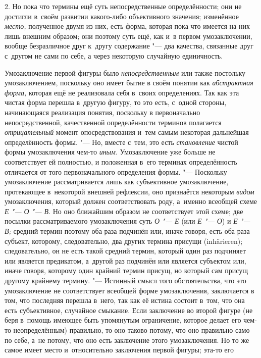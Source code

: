 2. Но пока что термины ещё суть непосредственные
определённости; они не достигли в~своём развитии какого-либо объективного
значения; изменённое {\em место,}
полученное двумя из них, есть форма, которая пока что имеется
на них лишь внешним образом; они поэтому суть ещё, как и~в
первом умозаключении, вообще безразличное друг к~другу содержание
"--- два качества, связанные друг с~другом не сами по себе, а
через некоторую случайную единичность.

Умозаключение первой фигуры было {\em непосредственным}
или также постольку умозаключением, поскольку оно имеет бытие
в своём понятии как {\em абстрактная
форма,} которая ещё не реализовала себя в~своих
определениях. Так как эта чистая форма перешла в~другую фигуру, то это
есть, с~одной стороны, начинающаяся реализация понятия, поскольку в
первоначально непосредственной, качественной определённости терминов
полагается {\em отрицательный}
момент опосредствования и~тем самым некоторая дальнейшая
определённость формы. "--- Но, вместе с~тем, это есть
{\em становление} чистой формы умозаключения чем-то {\em иным}.
Умозаключение уже больше не соответствует ей полностью, и
положенная в~его терминах определённость отличается от того первоначального
определения формы. "--- Поскольку умозаключение рассматривается
лишь как субъективное умозаключение, протекающее в~некоторой внешней
рефлексии, оно признаётся некоторым {\em видом}
умозаключения, который должен соответствовать роду, а~именно
всеобщей схеме {\em Е "--- О "--- В}. Но оно ближайшим
образом не соответствует этой схеме; две посылки рассматриваемого
умозаключения суть {\em О "--- Е} (или {\em Е "--- О}) и
{\em Е "--- В;} средний термин поэтому оба раза подчинён
или, иначе говоря, есть оба раза субъект, которому, следовательно, два
других термина присущи (inhärieren); следовательно, он не
есть такой средний термин, который один раз подчиняет или является
предикатом, а~другой раз подчинён или является субъектом или, иначе говоря,
которому один крайний термин присущ, но который сам присущ другому крайнему
термину. "--- Истинный смысл того обстоятельства, что это
умозаключение не соответствует всеобщей форме умозаключения, заключается в
том, что последняя перешла в~него, так как её истина состоит в~том, что она
есть субъективное, случайное смыкание. Если заключение во второй фигуре (не
беря в~помощь имеющее быть упомянутым ограничение, которое делает его
чем-то неопределённым) правильно, то оно таково потому, что оно правильно
само по себе, а~не потому, что оно есть заключение этого умозаключения. Но
то же самое имеет место и~относительно заключения первой фигуры; эта-то его
